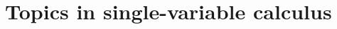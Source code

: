\documentclass[../book/calcnotes.tex]{subfiles}
\begin{document}
\part{Topics in single-variable calculus}
\label{part:derivative}



\end{document}

